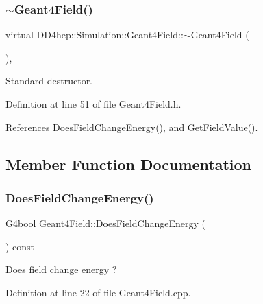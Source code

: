 \subsubsection{\texorpdfstring{$\sim$\+Geant4\+Field()}{~Geant4Field()}}
{\footnotesize\ttfamily virtual D\+D4hep\+::\+Simulation\+::\+Geant4\+Field\+::$\sim$\+Geant4\+Field (\begin{DoxyParamCaption}{ }\end{DoxyParamCaption})\hspace{0.3cm}{\ttfamily [inline]}, {\ttfamily [virtual]}}



Standard destructor. 



Definition at line 51 of file Geant4\+Field.\+h.



References Does\+Field\+Change\+Energy(), and Get\+Field\+Value().



\subsection{Member Function Documentation}
\hypertarget{class_d_d4hep_1_1_simulation_1_1_geant4_field_ae2f1ef05f6a4d0d2d323a89d34bb1000}{}\label{class_d_d4hep_1_1_simulation_1_1_geant4_field_ae2f1ef05f6a4d0d2d323a89d34bb1000} 
\subsubsection{\texorpdfstring{Does\+Field\+Change\+Energy()}{DoesFieldChangeEnergy()}}
{\footnotesize\ttfamily G4bool Geant4\+Field\+::\+Does\+Field\+Change\+Energy (\begin{DoxyParamCaption}{ }\end{DoxyParamCaption}) const\hspace{0.3cm}{\ttfamily [virtual]}}



Does field change energy ? 



Definition at line 22 of file Geant4\+Field.\+cpp.



